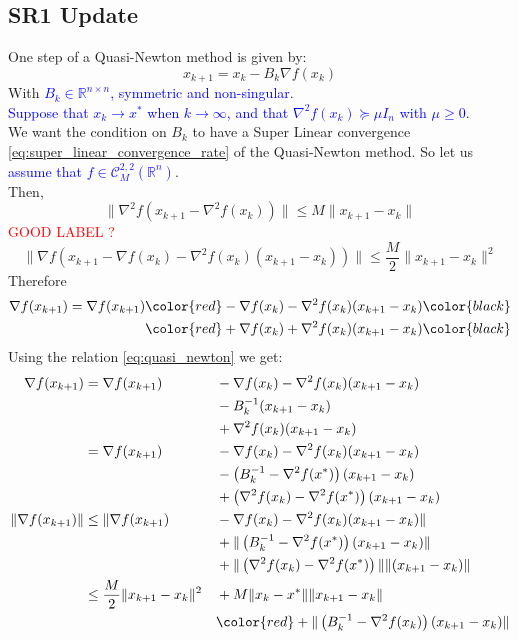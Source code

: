 \documentclass[12pt, openany]{report}
\newcommand{\R}{\mathbb{R}}
\newcommand{\C}{\mathcal{C}}
\theoremstyle{definition}
\begin{document}
\subsection{SR1 Update}
One step of a Quasi-Newton method is given by:
\begin{equation}\label{eq:quasi_newton}
	x_{k+1} = x_k -B_k \nabla f(x_k)
\end{equation}
With \textcolor{blue}{$B_k \in \R^{n\times n}$, symmetric and non-singular}.\\
\textcolor{blue}{Suppose that $x_k \to x^*$ when $k \to \infty$, and that $\nabla^2f(x_k) \succeq \mu I_n$ with $\mu \geq 0$}.\\
We want the condition on $B_k$ to have a Super Linear convergence \eqref{eq:super_linear_convergence_rate} of the Quasi-Newton method. So let us \textcolor{blue}{assume that $f \in \C_M^{2,2}(\R^n)$}.\\
Then,
\begin{equation}\label{eq:bound_hessian_difference}
	\|\nabla^2f(x_{k+1}-\nabla^2f(x_k))\| \leq M \|x_{k+1}-x_k\|
\end{equation}
\textcolor{red}{GOOD LABEL ?}
\begin{equation}\label{eq:M_smoothness}
	\|\nabla f(x_{k+1}-\nabla f(x_k)-\nabla^2 f(x_k)(x_{k+1}-x_k))\| \leq \frac{M}{2} \|x_{k+1}-x_k\|^2
\end{equation}
Therefore
\begin{equation}
	\begin{aligned}
		\nabla f(x_{k+1}) = \nabla f(x_{k+1}) &  \color{red}  - \nabla f(x_k) - \nabla^2 f(x_k) (x_{k+1}-x_k)  \color{black} \\ &  \color{red} + \nabla f(x_k) + \nabla^2 f(x_k) (x_{k+1}-x_k) \color{black}
	\end{aligned}
\end{equation}
Using the relation \eqref{eq:quasi_newton} we get:
\begin{equation}
	\begin{aligned}
		\nabla f(x_{k+1}) &= \nabla f(x_{k+1}) &&- \nabla f(x_k)- \nabla^2 f(x_k) (x_{k+1}-x_k)\\ 
		& &&- B_k^{-1}  (x_{k+1}-x_k)\\ 
		& &&+ \nabla^2 f(x_k) (x_{k+1}-x_k)\\
		&= \nabla f(x_{k+1})  &&- \nabla f(x_k) - \nabla^2 f(x_k) (x_{k+1}-x_k)\\
		& &&- \left(B_k^{-1} - \nabla^2 f(x^*)\right) (x_{k+1}-x_k)\\
		& &&+ \left( \nabla^2 f(x_k) - \nabla^2 f(x^*)\right) (x_{k+1}-x_k)\\
		\|\nabla f(x_{k+1})\| &\leq \|\nabla f(x_{k+1})  &&- \nabla f(x_k) - \nabla^2 f(x_k) (x_{k+1}-x_k) \| \\
		& &&+ \|\left(B_k^{-1} - \nabla^2 f(x^*)\right) (x_{k+1}-x_k)\|\\
		& &&+ \|\left( \nabla^2 f(x_k) - \nabla^2 f(x^*)\right) \| \|(x_{k+1}-x_k)\|\\ 
		&\leq \frac{M}{2} \|x_{k+1}-x_k\|^2 &&+ M \|x_k-x^*\| \|x_{k+1}-x_k\|\\
		& &&\color{red}+ \|\left(B_k^{-1}-\nabla^2f(x_k)\right)(x_{k+1}-x_k)\|
	\end{aligned}
\end{equation}
\end{document}
